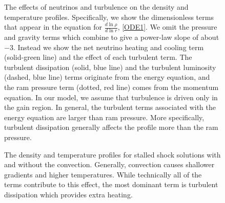 \documentclass[twocolumn]{aastex6}
\begin{document}
\begin{figure}[t]

\caption{The effects of neutrinos and turbulence on the density and temperature
  profiles.  Specifically, we show the dimensionless terms that appear
  in the equation for $\frac{d \ln \rho}{d \ln r}$, \ref{ODE1}. We omit the pressure and gravity terms
    which combine to give a power-law slope of about $-3$.  Instead we
  show the net neutrino heating and cooling term (solid-green line) and the effect of
  each turbulent term. The
  turbulent dissipation (solid, blue line) and the turbulent
  luminosity (dashed, blue line) terms originate
  from the energy equation, and the ram pressure term (dotted, red line)
  comes from the
  momentum equation.  In our model, we assume that turbulence is driven
  only in the gain region.  In general, the turbulent terms
  associated with the energy equation are larger than ram
  pressure.  More specifically, turbulent
  dissipation generally affects the profile more than the ram pressure. 
\label{normalized}
}
\end{figure}

\begin{figure}[t]
\caption{The density and temperature profiles for stalled
    shock solutions with and without the convection. Generally, convection causes
    shallower gradients and higher temperatures.  While technically
    all of the terms contribute to this effect, the most dominant term
  is turbulent dissipation which provides extra heating.  
}
\label{denstemp}
\end{figure}
\end{document}
